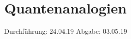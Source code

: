 

\subject{V23}
\title{Quantenanalogien}
\date{
  Durchführung: 24.04.19
  \hspace{3em}
  Abgabe: 03.05.19
}



\maketitle
\thispagestyle{empty}
\tableofcontents
\newpage




%



\newpage
\printbibliography


